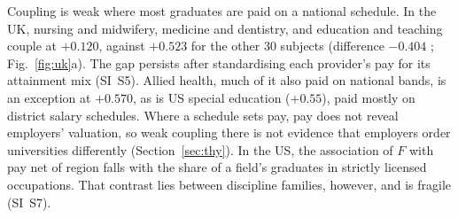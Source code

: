 Coupling is weak where most graduates are paid on a national schedule. In the UK, nursing and midwifery, medicine
and dentistry, and education and teaching couple at $+0.120$, against $+0.523$ for the other 30 subjects
(difference $-0.404$ ; Fig.~\ref{fig:uk}a). The gap persists after standardising each
provider's pay for its attainment mix (SI~S5). Allied health, much of it also paid on national bands, is an
exception at $+0.570$, as is US special education ($+0.55$), paid mostly on district salary schedules. Where a
schedule sets pay, pay does not reveal employers' valuation, so weak coupling there is not evidence that employers
order universities differently (Section~\ref{sec:thy}). In the US, the association of $F$ with pay net of region
falls with the share of a field's graduates in strictly licensed occupations. That contrast lies between
discipline families, however, and is fragile (SI~S7).

